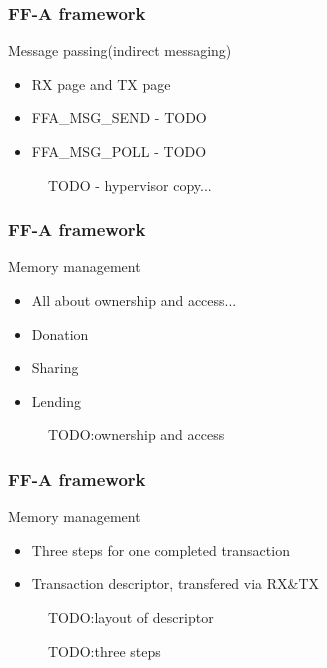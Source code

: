 \documentclass{beamer}
\begin{document}
\begin{frame}
  \frametitle{FF-A framework}
  Message passing(indirect messaging)
  \begin{itemize}
    \item RX page and TX page
    \item FFA\_MSG\_SEND - TODO
    \item FFA\_MSG\_POLL - TODO
  \end{itemize}
        \begin{figure}
        \caption{TODO - hypervisor copy...}
      \end{figure}
\end{frame}

\begin{frame}
  \frametitle{FF-A framework}
  Memory management
  \begin{itemize}
    \item All about ownership and access...
    \item Donation
    \item Sharing
      \item Lending
  \end{itemize}
  \begin{figure}
        \caption{TODO:ownership and access}
      \end{figure}
    \end{frame}

\begin{frame}
  \frametitle{FF-A framework}
  Memory management
  \begin{itemize}
    \item Three steps for one completed transaction
    \item Transaction descriptor, transfered via RX\&TX
  \end{itemize}
  \begin{figure}
        \caption{TODO:layout of descriptor}
      \end{figure}
       \begin{figure}
        \caption{TODO:three steps}
      \end{figure}
\end{frame}
\end{document}
